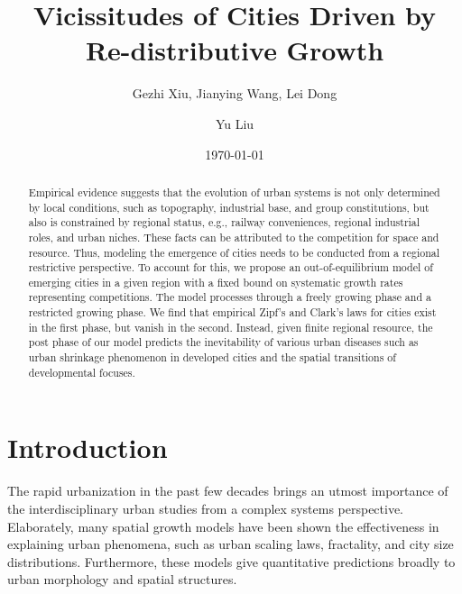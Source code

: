 \documentclass[reprint,unsortedaddress,amsmath,amssymb,aps,prl,showkeys]{revtex4-2}
\begin{document}
\title{Vicissitudes of Cities Driven by Re-distributive Growth}
\author{Gezhi Xiu, Jianying Wang, Lei Dong}
\author{Yu Liu}
\date{\today}

\begin{abstract}
    Empirical evidence suggests that the evolution of urban systems is not only determined by local conditions, such as topography, industrial base, and group constitutions, but also is constrained by regional status, e.g., railway conveniences, regional industrial roles, and urban niches. These facts can be attributed to the competition for space and resource. Thus, modeling the emergence of cities needs to be conducted from a regional restrictive perspective. To account for this, we propose an out-of-equilibrium model of emerging cities in a given region with a fixed bound on systematic growth rates representing competitions. The model processes through a freely growing phase and a restricted growing phase. We find that empirical Zipf's and Clark's laws for cities exist in the first phase, but vanish in the second. Instead, given finite regional resource, the post phase of our model predicts the inevitability of various urban diseases such as urban shrinkage phenomenon in developed cities and the spatial transitions of developmental focuses. 
\end{abstract}
\maketitle
\section{Introduction}

The rapid urbanization in the past few decades brings an utmost importance of the
interdisciplinary urban studies from a complex systems perspective. Elaborately, many spatial growth models have been shown the effectiveness in explaining urban phenomena, such as urban scaling laws\cite{court2013origins}, fractality\cite{batty1994fractal,batty2007cities}, and city size distributions\cite{zipf1949human}. Furthermore, these models give quantitative predictions broadly to urban morphology and spatial structures\cite{anas1998urban}. 
\end{document}
